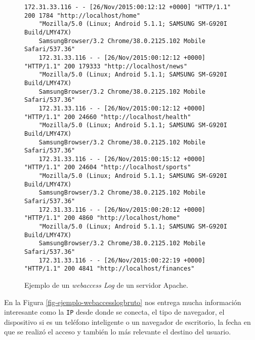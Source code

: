 \begin{figure}[tb]\label{fig-ejemplo-webaccesslogbruto} 
	\centering
	\begin{lstlisting}[frame=single,basicstyle=\ttfamily\tiny,]
	172.31.33.116 - - [26/Nov/2015:00:12:12 +0000] "HTTP/1.1" 200 1784 "http://localhost/home" 
	"Mozilla/5.0 (Linux; Android 5.1.1; SAMSUNG SM-G920I Build/LMY47X) 
	SamsungBrowser/3.2 Chrome/38.0.2125.102 Mobile Safari/537.36"
	172.31.33.116 - - [26/Nov/2015:00:12:12 +0000] "HTTP/1.1" 200 179333 "http://localhost/news" 
	"Mozilla/5.0 (Linux; Android 5.1.1; SAMSUNG SM-G920I Build/LMY47X) 
	SamsungBrowser/3.2 Chrome/38.0.2125.102 Mobile Safari/537.36"
	172.31.33.116 - - [26/Nov/2015:00:12:12 +0000] "HTTP/1.1" 200 24660 "http://localhost/health" 
	"Mozilla/5.0 (Linux; Android 5.1.1; SAMSUNG SM-G920I Build/LMY47X) 
	SamsungBrowser/3.2 Chrome/38.0.2125.102 Mobile Safari/537.36"
	172.31.33.116 - - [26/Nov/2015:00:15:12 +0000] "HTTP/1.1" 200 24604 "http://localhost/sports" 
	"Mozilla/5.0 (Linux; Android 5.1.1; SAMSUNG SM-G920I Build/LMY47X) 
	SamsungBrowser/3.2 Chrome/38.0.2125.102 Mobile Safari/537.36"
	172.31.33.116 - - [26/Nov/2015:00:20:12 +0000] "HTTP/1.1" 200 4860 "http://localhost/home" 
	"Mozilla/5.0 (Linux; Android 5.1.1; SAMSUNG SM-G920I Build/LMY47X) 
	SamsungBrowser/3.2 Chrome/38.0.2125.102 Mobile Safari/537.36"
	172.31.33.116 - - [26/Nov/2015:00:22:19 +0000] "HTTP/1.1" 200 4841 "http://localhost/finances" 
	\end{lstlisting}
	
	
	
	\caption{Ejemplo de un \emph{webaccess Log} de un servidor Apache.}
	\label{fig:accesslog-apache-teleton}
\end{figure}


  En la Figura \ref{fig-ejemplo-webaccesslogbruto} nos entrega mucha información interesante como la \texttt{IP} desde donde se conecta, el tipo de navegador, el dispositivo si es un teléfono inteligente o un navegador de escritorio, la fecha en que se realizó el acceso y también lo más relevante el destino del usuario.
  
  
  
  